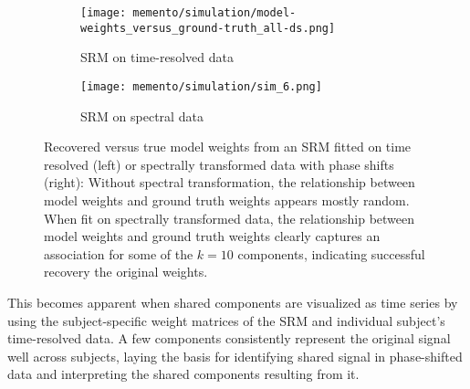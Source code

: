 \begin{figure}[H]
	\centering
	\begin{subfigure}{0.35\textwidth}
		\texttt{[image: memento/simulation/model-weights\_versus\_ground-truth\_all-ds.png]}
		\caption{SRM on time-resolved data}
		\label{fig:sim-timeresolved-weights}
	\end{subfigure}
	\begin{subfigure}{0.35\textwidth}
		\texttt{[image: memento/simulation/sim\_6.png]}
		\caption{SRM on spectral data}
		\label{fig:sim-spectral-weights}
	\end{subfigure}
	\caption[Relationship of model weights and true weights]{Recovered versus true model weights from an \gls{SRM} fitted on time resolved (left) or spectrally transformed data with phase shifts (right): Without spectral transformation, the relationship between model weights and ground truth weights appears mostly random. When fit on spectrally transformed data, the relationship between model weights and ground truth weights clearly captures an association for some of the $k=10$ components, indicating successful recovery the original weights.}
	\label{fig:sim-weights}
\end{figure}


This becomes apparent when shared components are visualized as time series by using the subject-specific weight matrices of the \gls{SRM} and individual subject's time-resolved data.
A few components consistently represent the original signal well across subjects, laying the basis for identifying shared signal in phase-shifted data and interpreting the shared components resulting from it.




